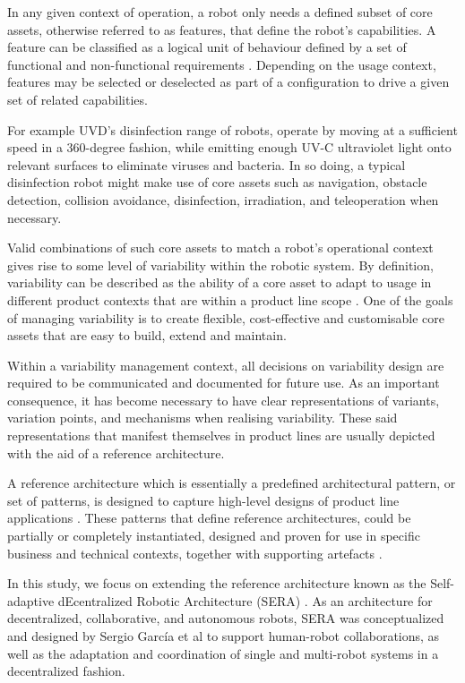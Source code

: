 \documentclass[conference]{IEEEtran}
\begin{document}
In any given context of operation, a robot only needs a defined subset of core assets, otherwise referred to as features, that define the robot's capabilities. A feature can be classified as a logical unit of behaviour defined by a set of functional and non-functional requirements \cite{feats}. Depending on the usage context, features may be selected or deselected as part of a configuration to drive a given set of related capabilities. 

For example UVD's disinfection range of robots, operate by moving at a sufficient speed in a 360-degree fashion, while emitting enough UV-C ultraviolet light onto relevant surfaces to eliminate viruses and bacteria. In so doing, a typical disinfection robot might make use of core assets such as navigation, obstacle detection, collision avoidance, disinfection, irradiation, and teleoperation when necessary.

Valid combinations of such core assets to match a robot's operational context gives rise to some level of variability within the robotic system. By definition, variability can be described as the ability of a core asset to adapt to usage in different product contexts that are within a product line scope \cite{variab}. One of the goals of managing variability is to create flexible, cost-effective and customisable core assets that are easy to build, extend and maintain.

Within a variability management context, all decisions on variability design are required to be communicated and documented for future use. As an important consequence, it has become necessary to have clear representations of variants, variation points, and mechanisms when realising variability. These said representations that manifest themselves in product lines are usually depicted with the aid of a reference architecture.

A reference architecture which is essentially a predefined architectural pattern, or set of patterns, is designed to capture high-level designs of product line applications \cite{sple}. These patterns that define reference architectures, could be partially or completely instantiated, designed and proven for use in specific business and technical contexts, together with supporting artefacts \cite{ref-arch}.

In this study, we focus on extending the reference architecture known as the Self-adaptive dEcentralized Robotic Architecture (SERA) \cite{sera}. As an architecture for decentralized, collaborative, and autonomous robots, SERA was conceptualized and designed by Sergio Garc\'{i}a et al to support human-robot collaborations, as well as the adaptation and coordination of single and multi-robot systems in a decentralized fashion.
\end{document}
